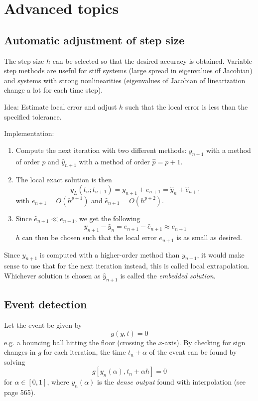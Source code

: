 \section{Advanced topics}
\subsection{Automatic adjustment of step size}
The step size $h$ can be selected so that the desired accuracy is obtained. Variable-step methods are useful for stiff systems (large spread in eigenvalues of Jacobian) and systems with strong nonlinearities (eigenvalues of Jacobian of linearization change a lot for each time step).

Idea: Estimate local error and adjust $h$ such that the local error is less than the specified tolerance.

Implementation:
\begin{enumerate}
    \item Compute the next iteration with two different methods: $y_{n+1}$ with a method of order $p$ and ${\hat{y}_{n+1}}$ with a method of order $\hat{p} = p+1$.
    \item The local exact solution is then
    \begin{equation}
        y_L(t_n;t_{n+1}) = y_{n+1} + e_{n+1} = \hat{y}_{n} + \hat{e}_{n+1}
    \end{equation}
    with $e_{n+1} = O(h^{p+1})$ and $\hat{e}_{n+1} = O(h^{p+2})$.
    \item Since $\hat{e}_{n+1} \ll e_{n+1}$, we get the following 
    \begin{equation}
        y_{n+1} - \hat{y}_{n} = e_{n+1} - \hat{e}_{n+1} \approx e_{n+1}
    \end{equation}
    $h$ can then be chosen such that the local error $e_{n+1}$ is as small as desired.
\end{enumerate}
Since $\hat{y}_{n+1}$ is computed with a higher-order method than $y_{n+1}$, it would make sense to use that for the next iteration instead, this is called local extrapolation. Whichever solution is chosen as $\hat{y}_{n+1}$ is called the \emph{embedded solution}.

\subsection{Event detection}
Let the event be given by
\begin{equation}
    g(y,t) = 0
\end{equation}
e.g. a bouncing ball hitting the floor (crossing the $x$-axis). By checking for sign changes in $g$ for each iteration, the time $t_n + \alpha$ of the event can be found by solving
\begin{equation}
    g[y_n(\alpha), t_n + \alpha h] = 0
\end{equation}
for $\alpha \in [0,1]$, where $y_n(\alpha)$ is the \emph{dense output} found with interpolation (see page 565).

